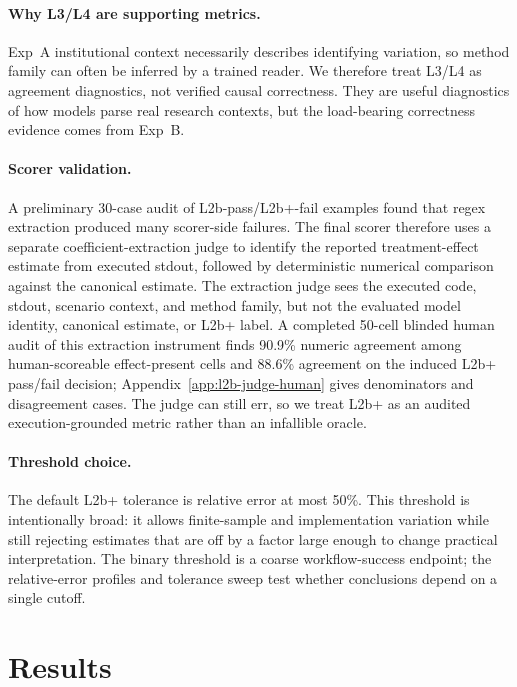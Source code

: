 \documentclass{article}
\begin{document}
\paragraph{Why L3/L4 are supporting metrics.}
Exp~A institutional context necessarily describes identifying variation,
so method family can often be inferred by a trained reader. We therefore
treat L3/L4 as agreement diagnostics, not verified causal correctness.
They are useful diagnostics of how models parse real research contexts, but the
load-bearing correctness evidence comes from Exp~B.

\paragraph{Scorer validation.}
A preliminary 30-case audit of L2b-pass/L2b+-fail examples found that
regex extraction produced many scorer-side failures. The final scorer
therefore uses a separate coefficient-extraction judge to identify the
reported treatment-effect estimate from executed stdout, followed by
deterministic numerical comparison against the canonical estimate. The
extraction judge sees the executed code, stdout, scenario context, and
method family, but not the evaluated model identity, canonical estimate,
or L2b+ label. A completed 50-cell blinded human audit of this extraction
instrument finds 90.9\% numeric agreement among human-scoreable
effect-present cells and 88.6\% agreement on the induced L2b+ pass/fail
decision; Appendix~\ref{app:l2b-judge-human} gives denominators and
disagreement cases. The judge can still err, so we treat L2b+ as an
audited execution-grounded metric rather than an infallible oracle.

\paragraph{Threshold choice.}
The default L2b+ tolerance is relative error at most 50\%. This
threshold is intentionally broad: it allows finite-sample and
implementation variation while still rejecting estimates that are off by
a factor large enough to change practical interpretation. The binary
threshold is a coarse workflow-success endpoint; the relative-error
profiles and tolerance sweep test whether conclusions depend on a single
cutoff.

\section{Results}
\end{document}
